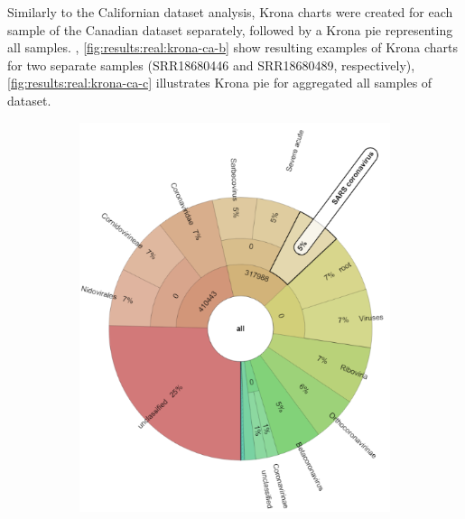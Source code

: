     Similarly to the Californian dataset analysis, Krona charts were created for each sample of the Canadian dataset separately, followed by a Krona pie representing all samples. , \ref{fig:results:real:krona-ca-b} show resulting examples of Krona charts for two separate samples (SRR18680446 and SRR18680489, respectively), \cref{fig:results:real:krona-ca-c} illustrates Krona pie for aggregated all samples of dataset.
    \begin{figure}[H]
        \centering
        \begin{subfigure}[b]{0.46\textwidth}
        \includegraphics[width=1\textwidth]{figures/results/real/krona/krona-ca-sSRR18680446.png}
        \label{fig:results:real:krona-ca-a}
        \end{subfigure}
        \hfill
        \begin{subfigure}[b]{0.44\textwidth}

\end{subfigure}
\end{figure}
